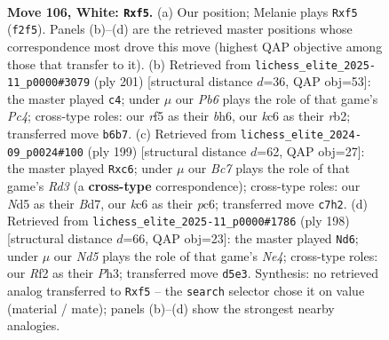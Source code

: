 \documentclass[11pt]{article}
\begin{document}
\clearpage

\begin{figure}[p]\centering
\begin{subfigure}{0.46\textwidth}\centering
\resizebox{\linewidth}{!}{%
\newchessgame
\chessboard[
  setfen={8/2B5/PPk5/3N1r1b/1K6/7p/5R2/8 w - - 0 106},
  showmover=false,
  pgfstyle=straightmove, color=movearrow, markmove={f2-f5}
]}
\caption{}
\end{subfigure}\hfill
\begin{subfigure}{0.46\textwidth}\centering
\resizebox{\linewidth}{!}{%
\newchessgame
\chessboard[
  setfen={8/8/pK5B/Pbp5/8/1n6/1R6/3k4 b - - 80 101},
  showmover=false,
  pgfstyle=straightmove, color=movearrow, markmove={c5-c4}
]}
\caption{}
\end{subfigure}
\\[4pt]
\begin{subfigure}{0.46\textwidth}\centering
\resizebox{\linewidth}{!}{%
\newchessgame
\chessboard[
  setfen={2k5/3b4/2Pr4/Q3Kp2/4p3/6P1/8/8 b - - 2 100},
  showmover=false,
  pgfstyle=straightmove, color=movearrow, markmove={d6-c6}
]}
\caption{}
\end{subfigure}\hfill
\begin{subfigure}{0.46\textwidth}\centering
\resizebox{\linewidth}{!}{%
\newchessgame
\chessboard[
  setfen={2B5/8/8/7b/3kNp1p/r6P/5K2/8 w - - 8 100},
  showmover=false,
  pgfstyle=straightmove, color=movearrow, markmove={e4-d6}
]}
\caption{}
\end{subfigure}
\caption{\textbf{Move 106, White: \texttt{Rxf5}.} (a) Our position; Melanie plays \texttt{Rxf5} (\texttt{f2f5}). Panels (b)--(d) are the retrieved master positions whose correspondence most drove this move (highest QAP objective among those that transfer to it). (b) Retrieved from \texttt{lichess\_elite\_2025-11\_p0000\#3079} (ply 201) [structural distance $d$=36, QAP obj=53]: the master played \texttt{c4}; under $\mu$ our \emph{Pb6} plays the role of that game's \emph{Pc4}; cross-type roles: our \emph{r}f5 as their \emph{b}h6, our \emph{k}c6 as their \emph{r}b2; transferred move \texttt{b6b7}. (c) Retrieved from \texttt{lichess\_elite\_2024-09\_p0024\#100} (ply 199) [structural distance $d$=62, QAP obj=27]: the master played \texttt{Rxc6}; under $\mu$ our \emph{Bc7} plays the role of that game's \emph{Rd3} (a \textbf{cross-type} correspondence); cross-type roles: our \emph{N}d5 as their \emph{B}d7, our \emph{k}c6 as their \emph{p}c6; transferred move \texttt{c7h2}. (d) Retrieved from \texttt{lichess\_elite\_2025-11\_p0000\#1786} (ply 198) [structural distance $d$=66, QAP obj=23]: the master played \texttt{Nd6}; under $\mu$ our \emph{Nd5} plays the role of that game's \emph{Ne4}; cross-type roles: our \emph{R}f2 as their \emph{P}h3; transferred move \texttt{d5e3}. Synthesis: no retrieved analog transferred to \texttt{Rxf5} -- the \texttt{search} selector chose it on value (material / mate); panels (b)--(d) show the strongest nearby analogies.}
\label{fig:thought-m210}
\end{figure}
\end{document}
